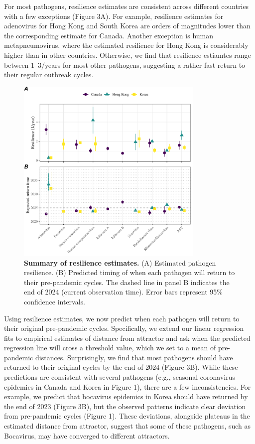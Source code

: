 \documentclass[12pt]{article}
\begin{document}
For most pathogens, resilience estimates are consistent across different countries with a few exceptions (Figure 3A).
For example, resilience estimates for adenovirus for Hong Kong and South Korea are orders of magnitudes lower than the corresponding estimate for Canada.
Another exception is human metapneumovirus, where the estimated resilience for Hong Kong is considerably higher than in other countries.
Otherwise, we find that resilience estiamtes range between 1--3/years for most other pathogens, suggesting a rather fast return to their regular outbreak cycles.

\begin{figure}[!th]
\begin{center}
\includegraphics[width=0.8\textwidth]{../figure3/figure3.pdf}
\caption{
\textbf{Summary of resilience estimates.}
(A) Estimated pathogen resilience.
(B) Predicted timing of when each pathogen will return to their pre-pandemic cycles.
The dashed line in panel B indicates the end of 2024 (current observation time).
Error bars represent 95\% confidence intervals.
}
\end{center}
\end{figure}

Using resilience estimates, we now predict when each pathogen will return to their original pre-pandemic cycles.
Specifically, we extend our linear regression fits to empirical estimates of distance from attractor and ask when the predicted regression line will cross a threshold value, which we set to a mean of pre-pandemic distances.
Surprisingly, we find that most pathogens should have returned to their original cycles by the end of 2024 (Figure 3B).
While these predictions are consistent with several pathogens (e.g., seasonal coronavirus epidemics in Canada and Korea in Figure 1),
there are a few inconsistencies.
For example, we predict that bocavirus epidemics in Korea should have returned by the end of 2023 (Figure 3B), but the observed patterns indicate clear deviation from pre-pandemic cycles (Figure 1).
These deviations, alongside plateaus in the estimated distance from attractor, suggest that some of these pathogens, such as Bocavirus, may have converged to different attractors.
\end{document}
